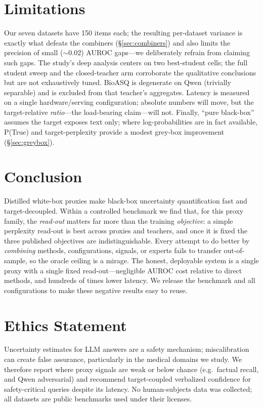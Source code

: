 \documentclass[11pt]{article}
\begin{document}
\section{Limitations}
Our seven datasets have 150 items each; the resulting per-dataset variance is exactly
what defeats the combiners (\S\ref{sec:combiners}) and also limits the precision of
small ($\sim$0.02) AUROC gaps---we deliberately refrain from claiming such gaps. The
study's deep analysis centers on two best-student cells; the full student sweep and the
closed-teacher arm corroborate the qualitative conclusions but are not exhaustively
tuned. BioASQ is degenerate on Qwen (trivially separable) and is excluded from that
teacher's aggregates. Latency is measured on a single hardware/serving configuration;
absolute numbers will move, but the target-relative \emph{ratio}---the load-bearing
claim---will not. Finally, ``pure black-box'' assumes the target exposes text only; where
log-probabilities are in fact available, P(True) and target-perplexity provide a modest
grey-box improvement (\S\ref{sec:greybox}).

\section{Conclusion}
Distilled white-box proxies make black-box uncertainty quantification fast and
target-decoupled. Within a controlled benchmark we find that, for this proxy family, the
\emph{read-out} matters far more than the training \emph{objective}: a simple perplexity
read-out is best across proxies and teachers, and once it is fixed the three published
objectives are indistinguishable. Every attempt to do better by \emph{combining}
methods, configurations, signals, or experts fails to transfer out-of-sample, so the
oracle ceiling is a mirage. The honest, deployable system is a single proxy with a
single fixed read-out---negligible AUROC cost relative to direct methods, and hundreds
of times lower latency. We release the benchmark and all configurations to make these
negative results easy to reuse.

\section*{Ethics Statement}
Uncertainty estimates for LLM answers are a safety mechanism; miscalibration can create
false assurance, particularly in the medical domains we study. We therefore report where
proxy signals are weak or below chance (e.g.\ factual recall, and Qwen adversarial) and
recommend target-coupled verbalized confidence for safety-critical queries despite its
latency. No human-subjects data was collected; all datasets are public benchmarks used
under their licenses.
\end{document}
